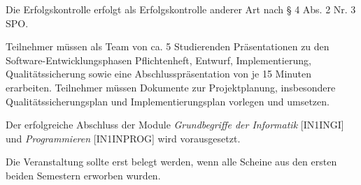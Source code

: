 \begin{course}

\setdoclanguagegerman
{}



\coursehead


\label{cour_10787.dp_997}


\begin{styleenv}
\begin{assessment}
Die Erfolgskontrolle erfolgt als Erfolgskontrolle anderer Art nach § 4 Abs. 2 Nr. 3 SPO.

 

Teilnehmer müssen als Team von ca. 5 Studierenden Präsentationen zu den Software-Entwicklungsphasen Pflichtenheft, Entwurf, Implementierung, Qualitätssicherung sowie eine Abschlusspräsentation von je 15 Minuten erarbeiten. Teilnehmer müssen Dokumente zur Projektplanung, insbesondere Qualitätssicherungsplan und Implementierungsplan vorlegen und umsetzen.


\end{assessment}

\begin{conditions}Der erfolgreiche Abschluss der Module \emph{Grundbegriffe der Informatik} [IN1INGI] und\emph{ Programmieren} [IN1INPROG] wird vorausgesetzt.

\end{conditions}

\begin{recommendations}Die Veranstaltung sollte erst belegt werden, wenn alle Scheine aus den ersten beiden Semestern erworben wurden.

\end{recommendations}
\end{styleenv}


\end{course}
